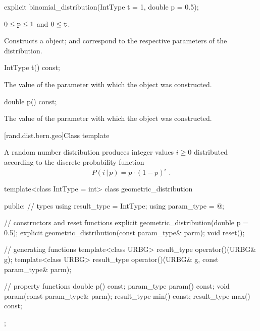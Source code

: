 %
\begin{itemdecl}
explicit binomial_distribution(IntType t = 1, double p = 0.5);
\end{itemdecl}

\begin{itemdescr}
\pnum\requires
 $0 \leq \texttt{p} \leq 1$ and $0 \leq \texttt{t} $.

\pnum\effects Constructs a  object;
  and 
 correspond to the respective parameters of the distribution.
\end{itemdescr}

%
\begin{itemdecl}
IntType t() const;
\end{itemdecl}%
\begin{itemdescr}
\pnum\returns The value of the  parameter
 with which the object was constructed.
\end{itemdescr}

%
\begin{itemdecl}
double p() const;
\end{itemdecl}

\begin{itemdescr}
\pnum\returns The value of the  parameter
 with which the object was constructed.
\end{itemdescr}


[rand.dist.bern.geo]{Class template }
%
%

\pnum
A  random number distribution
produces integer values $i \geq 0$
distributed according to
the discrete probability function
%
%
\[ P(i\,|\,p) = p \cdot (1-p)^{i} \text{ .} \]

%
\begin{codeblock}
template<class IntType = int>
  class geometric_distribution {
  public:
    // types
    using result_type = IntType;
    using param_type  = @\unspec@;

    // constructors and reset functions
    explicit geometric_distribution(double p = 0.5);
    explicit geometric_distribution(const param_type& parm);
    void reset();

    // generating functions
    template<class URBG>
      result_type operator()(URBG& g);
    template<class URBG>
      result_type operator()(URBG& g, const param_type& parm);

    // property functions
    double p() const;
    param_type param() const;
    void param(const param_type& parm);
    result_type min() const;
    result_type max() const;
  };
\end{codeblock}



